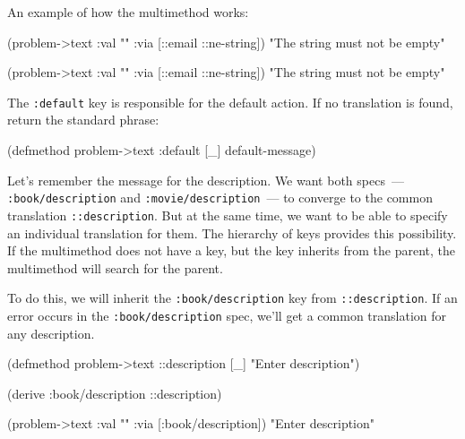 \noindent
An example of how the multimethod works:

\ifx\DEVICETYPE\MOBILE

  \begin{clojure}
(problem->text
  {:val "" :via [::email ::ne-string]})
"The string must not be empty"
  \end{clojure}

\else

  \begin{clojure}
(problem->text {:val "" :via [::email ::ne-string]})
"The string must not be empty"
  \end{clojure}

\fi

The \verb|:default| key is responsible for the default action. If no translation is found, return the standard phrase:

\begin{english}
  \begin{clojure}
(defmethod problem->text :default [_]
  default-message)
  \end{clojure}
\end{english}


Let's remember the message for the description. We want both specs~--- \verb|:book/description| and \verb|:movie/description|~--- to converge to the common translation \verb|::description|. But at the same time, we want to be able to specify an individual translation for them. The hierarchy of keys provides this possibility. If the multimethod does not have a key, but the key inherits from the parent, the multimethod will search for the parent.

\mnoindent
To do this, we will inherit the \verb|:book/description| key from
\verb|::description|. If an error occurs in the \verb|:book/description| spec, we'll get a common translation for any description.


\ifx\DEVICETYPE\MOBILE

  \begin{clojure}
(defmethod problem->text
  ::description [_] "Enter description")

(derive :book/description ::description)

(problem->text
  {:val "" :via [:book/description]})
"Enter description"
  \end{clojure}

